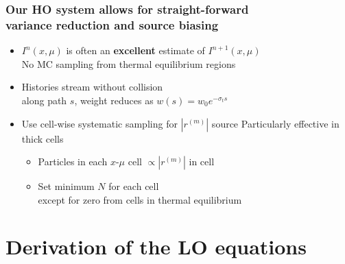 \documentclass[xcolor=dvipsnames,hyperref={pdfpagelabels=false},unknownkeysallowed]{beamer}
\newcommand{\colb}[1]{{\color{blue} #1}}
\newcommand{\colG}[1]{{\color{Gray!110} #1}}
\newlength{\wideitemsep}
\let\olditem\item
\renewcommand{\item}{\setlength{\itemsep}{\wideitemsep}\olditem}
\begin{document}
\begin{frame}
    \frametitle{Our HO system allows for straight-forward \\ variance reduction and source biasing}
    \addtolength{\wideitemsep}{0.15in}
    \begin{itemize}
        \item[] $I^{n}(x,\mu)$ is often an \colb{\textbf{excellent}} estimate of
            $I^{n+1}(x,\mu)$\\  \colG{No MC sampling from thermal equilibrium regions}
        \item[] Histories stream without collision \\
            \colG{along path $s$, weight reduces as $w(s)=w_0 e^{-\sigma_t s}$}
        \item[] Use cell-wise {systematic} sampling for $|r^{(m)}|$ source
            \colG{Particularly effective in thick cells}
            \begin{itemize}
                    \vspace{0.02in}
                \item Particles in  each $x$-$\mu$ cell $\propto |r^{(m)}|$ in cell
                \vspace{-0.15in}
                \item Set minimum $N$ for each cell  \\
                    \colG{except for zero from cells in thermal equilibrium}
            \end{itemize}
    \end{itemize}
\end{frame}



\section{Derivation of the LO equations}
\subsection{}
\end{document}
